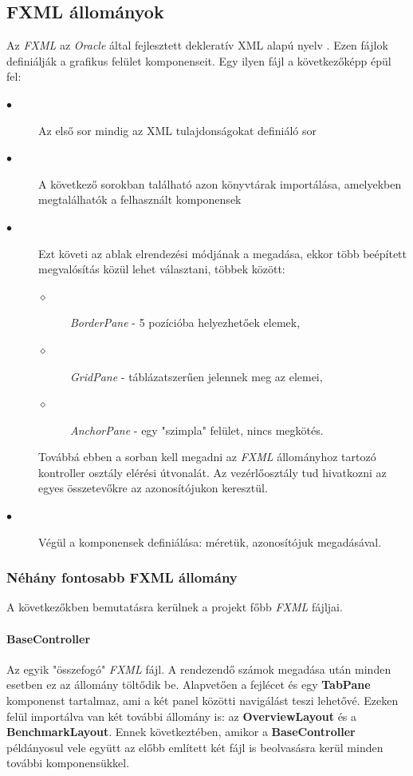 \documentclass{elteikthesis}
\begin{document}
\subsection{FXML állományok}
Az \emph{FXML} az \emph{Oracle} által fejlesztett dekleratív XML alapú nyelv \cite{FXML}. Ezen fájlok definiálják a grafikus felület komponenseit. Egy ilyen fájl a következőképp épül fel:
\begin{description}
	\item[$\bullet$] Az első sor mindig az XML tulajdonságokat definiáló sor
	\item[$\bullet$] A következő sorokban található azon könyvtárak importálása, amelyekben megtalálhatók a felhasznált komponensek
	\item[$\bullet$] Ezt követi az ablak elrendezési módjának a megadása, ekkor több beépített megvalósítás közül lehet választani, többek között:
		\begin{description}
		\item[$\diamond$] \emph{BorderPane} - 5 pozícióba helyezhetőek elemek,
		\item[$\diamond$] \emph{GridPane} - táblázatszerűen jelennek meg az elemei,
		\item[$\diamond$] \emph{AnchorPane} - egy "szimpla" felület, nincs megkötés.
		\end{description}
	Továbbá ebben a sorban kell megadni az \emph{FXML} állományhoz tartozó kontroller osztály elérési útvonalát. Az vezérlőosztály tud hivatkozni az egyes összetevőkre az azonosítójukon keresztül.
	\item[$\bullet$] Végül a komponensek definiálása: méretük, azonosítójuk megadásával.
\end{description}
\subsubsection{Néhány fontosabb FXML állomány}
A következőkben bemutatásra kerülnek a projekt főbb \emph{FXML} fájljai.
\paragraph{BaseController}
Az egyik "összefogó" \emph{FXML} fájl. A rendezendő számok megadása után minden esetben ez az állomány töltődik be. Alapvetően a fejlécet és egy \textbf{TabPane} komponenst tartalmaz, ami a két panel közötti navigálást teszi lehetővé. Ezeken felül importálva van két további állomány is: az \textbf{OverviewLayout} és a \textbf{BenchmarkLayout}. Ennek következtében, amikor a \textbf{BaseController} példányosul vele együtt az előbb említett két fájl is beolvasásra kerül minden további komponensükkel.
\end{document}
